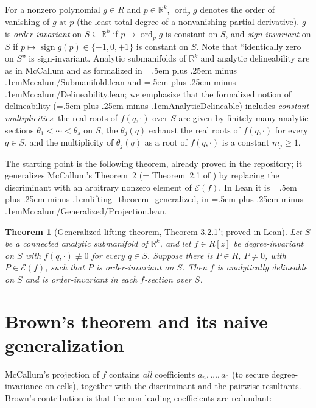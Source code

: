 \documentclass[11pt,a4paper]{article}
\newtheorem{theorem}{Theorem}[section]
\theoremstyle{definition}
\newcommand{\R}{\mathbb{R}}
\newcommand{\ord}{\operatorname{ord}}
\newcommand{\E}{\mathcal{E}}
\newcommand{\code}[1]{{\ttfamily\spaceskip=.5em plus .25em minus .1em\relax #1}}
\begin{document}
For a nonzero polynomial $g \in R$ and $p \in \R^k$, $\ord_p g$ denotes the
order of vanishing of $g$ at $p$ (the least total degree of a nonvanishing
partial derivative). $g$ is \emph{order-invariant} on $S \subseteq \R^k$ if
$p \mapsto \ord_p g$ is constant on $S$, and \emph{sign-invariant} on $S$ if
$p \mapsto \operatorname{sign} g(p) \in \{-1,0,+1\}$ is constant on $S$. Note
that ``identically zero on $S$'' is sign-invariant. Analytic submanifolds of
$\R^k$ and analytic delineability are as in McCallum \cite{McCallum98} and as
formalized in \code{Mccalum/Submanifold.lean} and
\code{Mccalum/Delineability.lean}; we emphasize that the formalized notion of
delineability (\code{AnalyticDelineable}) includes \emph{constant
multiplicities}: the real roots of $f(q,\cdot)$ over $S$ are given by finitely
many analytic sections $\theta_1 < \cdots < \theta_s$ on $S$, the
$\theta_j(q)$ exhaust the real roots of $f(q,\cdot)$ for every $q\in S$, and
the multiplicity of $\theta_j(q)$ as a root of $f(q,\cdot)$ is a constant
$m_j \geq 1$.

The starting point is the following theorem, already proved in the repository;
it generalizes McCallum's Theorem~2 \cite{McCallum98} (= Theorem~2.1 of
\cite{Brown01}) by replacing the discriminant with an arbitrary nonzero element
of $\E(f)$. In Lean it is \code{lifting\_theorem\_generalized}, in
\code{Mccalum/Generalized/Projection.lean}.

\begin{theorem}[Generalized lifting theorem, Theorem 3.2.1$'$; proved in Lean]
\label{thm:lifting}
Let $S$ be a connected analytic submanifold of $\R^k$, and let $f \in R[z]$ be
degree-invariant on $S$ with $f(q,\cdot) \not\equiv 0$ for every $q \in S$.
Suppose there is $P \in R$, $P \neq 0$, with $P \in \E(f)$, such that $P$ is
order-invariant on $S$. Then $f$ is analytically delineable on $S$ and is
order-invariant in each $f$-section over $S$.
\end{theorem}

\section{Brown's theorem and its naive generalization}\label{sec:brown}

McCallum's projection of $f$ contains \emph{all} coefficients $a_n,\dots,a_0$
(to secure degree-invariance on cells), together with the discriminant and the
pairwise resultants. Brown's contribution \cite[Theorem~3.1]{Brown01} is that
the non-leading coefficients are redundant:
\end{document}
